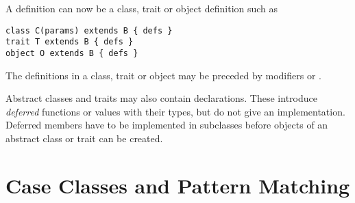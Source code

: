 \documentclass[a4paper,12pt,twoside,titlepage]{book}
\begin{document}
A definition can now be a class, trait or object definition such as
\begin{lstlisting}
class C(params) extends B { defs }
trait T extends B { defs }
object O extends B { defs }
\end{lstlisting}
The definitions  in a class, trait or object may be
preceded by modifiers  or .

Abstract classes and traits may also contain declarations. These
introduce {\em deferred} functions or values with their types, but do
not give an implementation. Deferred members have to be implemented in
subclasses before objects of an abstract class or trait can be created.

\chapter{Case Classes and Pattern Matching}
\end{document}
